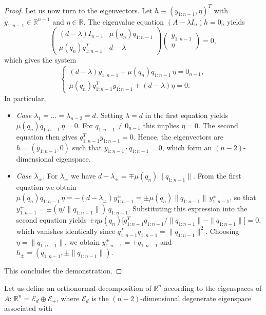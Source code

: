 \documentclass{rendiconti}
\begin{document}
\begin{proof}
Let us now turn to the eigenvectors.
Let $h\equiv(y_{1:n-1},\eta)^T$ with $y_{1:n-1}\in\mathbb{R}^{n-1}$ and $\eta\in\mathbb{R}$.
The eigenvalue equation $(A-\lambda I_n)h=0_n$ yields
\begin{equation}
\begin{pmatrix}
(d-\lambda)I_{n-1} & \mu(q_n) q_{1:n-1} \\
\mu(q_n) q_{1:n-1}^T & d-\lambda
\end{pmatrix}
\begin{pmatrix}
y_{1:n-1}\\
\eta
\end{pmatrix}
=0,
\end{equation}
which gives the system
\begin{equation}
\begin{cases}
(d-\lambda)y_{1:n-1}+\mu(q_n) q_{1:n-1}\,\eta=0_{n-1}, \\
\mu(q_n) q_{1:n-1}^T y_{1:n-1}+(d-\lambda)\eta=0.
\end{cases}
\end{equation}
In particular,
\begin{itemize}
\item \textit{Case $\lambda_1=\dots=\lambda_{n-2}=d$.}
Setting $\lambda=d$ in the first equation yields
$\mu(q_n) q_{1:n-1}\,\eta=0$.
For $q_{1:n-1}\neq0_{n-1}$ this implies $\eta=0$.
The second equation then gives
$q_{1:n-1}^T y_{1:n-1}=0$.
Hence, the eigenvectors are
$h=(y_{1:n-1},0)$ such that $y_{1:n-1}\cdot q_{1:n-1}=0$,
which form an $(n-2)$-dimensional eigenspace.

\item \textit{Case $\lambda_\pm$.}
For $\lambda_\pm$ we have $d-\lambda_\pm=\mp\mu(q_n)\|q_{1:n-1}\|$.
From the first equation we obtain
$\mu(q_n) q_{1:n-1}\,\eta
=-(d-\lambda_\pm)y^\pm_{1:n-1}
=\pm\mu(q_n)\|q_{1:n-1}\|\,y^\pm_{1:n-1}$,
so that
$y^\pm_{1:n-1}=\pm(\eta/\|q_{1:n-1}\|)\,q_{1:n-1}$.
Substituting this expression into the second equation yields
$\pm\eta\mu(q_n)\bigl[q_{1:n-1}^T q_{1:n-1}/\|q_{1:n-1}\|
-\|q_{1:n-1}\|\bigr]=0$,
which vanishes identically since
$q_{1:n-1}^T q_{1:n-1}=\|q_{1:n-1}\|^2$.
Choosing $\eta=\|q_{1:n-1}\|$, we obtain
$y^\pm_{1:n-1}=\pm q_{1:n-1}$ and
$h_\pm=(q_{1:n-1},\pm\|q_{1:n-1}\|)$.
\end{itemize}
This concludes the demonstration.
\end{proof}
%
Let us define an orthonormal decomposition of $\mathbb{R}^n$ according to the eigenspaces of $A$:
$\mathbb{R}^n = \mathcal{E}_d \oplus \mathcal{E}_\pm$,
where $\mathcal{E}_d$ is the $(n-2)$-dimensional degenerate eigenspace associated with
\end{document}
